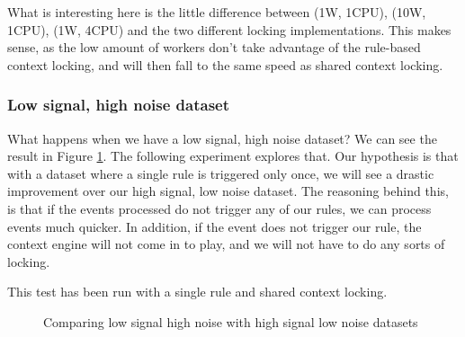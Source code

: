 What is interesting here is the little difference between (1W, 1CPU), (10W, 1CPU), (1W, 4CPU) and the two different locking implementations. This makes sense, as the low amount of workers don't take advantage of the rule-based context locking, and will then fall to the same speed as shared context locking.

\subsubsection{Low signal, high noise dataset}


What happens when we have a low signal, high noise dataset? We can see the result in Figure \cref{fig:comparing-lshn-hsln}. The following experiment explores that. Our hypothesis is that with a dataset where a single rule is triggered only once, we will see a drastic improvement over our high signal, low noise dataset. The reasoning behind this, is that if the events processed do not trigger any of our rules, we can process events much quicker. In addition, if the event does not trigger our rule, the context engine will not come in to play, and we will not have to do any sorts of locking.

This test has been run with a single rule and shared context locking. 

\begin{figure}[ht]
\centering
{}
\caption{Comparing low signal high noise with high signal low noise datasets }
\label{fig:comparing-lshn-hsln}
\end{figure}
